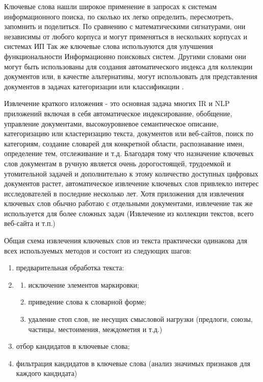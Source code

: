 
Ключевые слова нашли широкое применение в запросах к системам информационного поиска, по сколько их легко определить, пересмотреть, запомнить и поделиться.
По сравнению с математическими сигнатурами, они независимы от любого корпуса и могут применяться в нескольких корпусах и системах ИП \cite{5}
Так же ключевые слова используются для улучшения функциональности Информационно поисковых систем.
Другими словами они могут быть использованы для создания автоматического индекса для коллекции документов или, в качестве альтернативы, могут использовать для представления документов в задачах категоризации или классификации \cite{1}.

Извлечение краткого изложения - это основная задача многих IR и NLP приложений включая в себя автоматическое индексирование, обобщение, управление документами, высокоуровневое семантическое описание, категоризацию или кластеризацию текста, документов или веб-сайтов, поиск по категориям, создание словарей для конкретной области, распознавание имен, определение тем, отслеживание и т.д.
Благодаря тому что назначение ключевых слов документам в ручную является очень дорогостоящей, трудоемкой и утомительной задачей и дополнительно к этому количество доступных цифровых документов растет, автоматическое извлечение ключевых слов привлекло интерес исследователей в последние несколько лет.
Хотя приложения для извлечения ключевых слов обычно работаю с отдельными документами, извлечение так же используется для более сложных задач (Извлечение из коллекции текстов, всего веб-сайта и т.п.)

Общая схема извлечения ключевых слов из текста практически одинакова для всех используемых методов и состоит из следующих шагов:
\begin{enumerate}
	\item предварительная обработка текста:
	\item \begin{enumerate}
		\item исключение элементов маркировки;
		\item приведение слова к словарной форме;
		\item удаление стоп слов, не несущих смысловой нагрузки (предлоги, союзы, частицы, местоимения, междометия и т.д.)
	\end{enumerate}
	\item отбор кандидатов в ключевые слова;
	\item фильтрация кандидатов в ключевые слова (анализ значимых признаков для каждого кандидата)
\end{enumerate}

